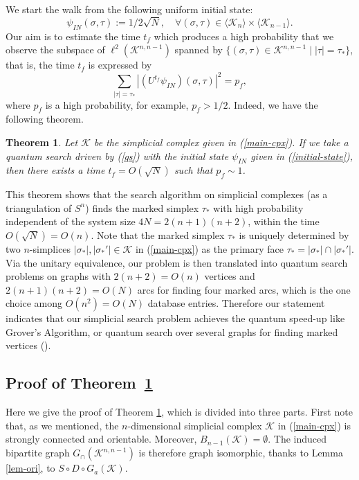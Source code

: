 \documentclass[a4paper,12pt]{article}
\newtheorem{theorem}[definition]{Theorem}
\numberwithin{equation}{section}
\begin{document}
We start the walk from the following uniform initial state: 
\begin{equation}
\label{initial-state}
\psi_{IN}(\sigma,\tau) :=1/2\sqrt{N},\quad \forall (\sigma, \tau)\in \langle \mathcal{K}_n\rangle \times \langle \mathcal{K}_{n-1}\rangle.
\end{equation}
Our aim is to estimate the time $t_f$ which produces a high probability that we observe the subspace of $\ell^2(\mathcal{K}^{n,n-1})$ 
spanned by $\{(\sigma,\tau)\in \mathcal{K}^{n,n-1} \;|\; |\tau|=\tau_\ast \}$, 
that is, the time $t_f$ is expressed by  
	\[ \sum_{|\tau|=\tau_\ast}|(U^{t_f}\psi_{IN})(\sigma,\tau)|^2 = p_f, \]
where $p_f$ is a high probability, for example, $p_f>1/2$. 
Indeed, we have the following theorem. 
%
\begin{theorem}
\label{thm-search}
Let $\mathcal{K}$ be the simplicial complex given in (\ref{main-cpx}).
If we take a quantum search driven by (\ref{qs}) with the initial state $\psi_{IN}$ given in (\ref{initial-state}), then there exists a time $t_f=O(\sqrt{N})$ 
such that $p_f\sim 1$. 
\end{theorem}
This theorem shows that the search algorithm on simplicial complexes (as a triangulation of $S^n$) finds the marked simplex $\tau_\ast$ with high probability independent of the system size $4N=2(n+1)(n+2)$, within the time $O(\sqrt{N}) = O(n)$.
Note that the marked simplex $\tau_\ast$ is uniquely determined by two $n$-simplices $|\sigma_\ast|, |\sigma_\ast'|\in \mathcal{K}$ in (\ref{main-cpx}) as the primary face $\tau_\ast = |\sigma_\ast|\cap |\sigma_\ast'|$.
Via the unitary equivalence, our problem is then translated into quantum search problems on graphs with $2(n+2)=O(n)$ vertices and $2(n+1)(n+2)=O(N)$ arcs for finding four marked arcs, which is the one choice among $O(n^2) = O(N)$ database entries.
Therefore our statement indicates that our simplicial search problem achieves the quantum speed-up like Grover's Algorithm, or quantum search over several graphs for finding marked vertices (\cite{ADFP2012, ADMP2010, P2013, S2008, SKW2003}).


%
\subsection{Proof of Theorem~\ref{thm-search}}
Here we give the proof of Theorem \ref{thm-search}, which is divided into three parts.
First note that, as we mentioned, the $n$-dimensional simplicial complex $\mathcal{K}$ in (\ref{main-cpx}) is strongly connected and orientable.
Moreover, $B_{n-1}(\mathcal{K}) = \emptyset$.
The induced bipartite graph $G_\cap(\mathcal{K}^{n,n-1})$ is therefore graph isomorphic, thanks to Lemma \ref{lem-ori}, to $S\circ D\circ G_a(\mathcal{K})$.
\end{document}
